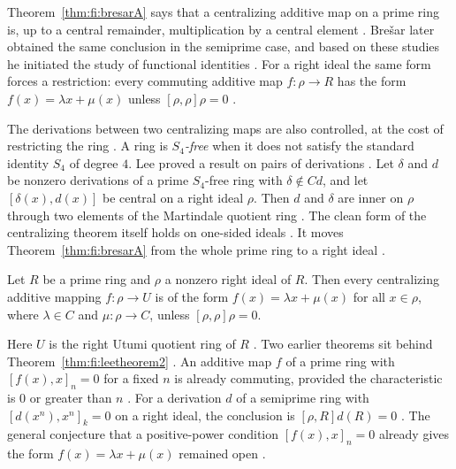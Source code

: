 Theorem~\ref{thm:fi:bresarA} says that a centralizing additive map on a
prime ring is, up to a central remainder, multiplication by a central
element \cite[p.~385]{Bresar1993}. Bre\v{s}ar later obtained the same
conclusion in the semiprime case, and based on these studies he initiated
the study of functional identities \cite[p.~333]{LeeTK1997Centralizing}.
For a right ideal the same form forces a restriction: every commuting
additive map $f\colon\rho\to R$ has the form $f(x)=\lambda x+\mu(x)$
unless $[\rho,\rho]\rho=0$ \cite[p.~333]{LeeTK1997Centralizing}.

The derivations between two centralizing maps are also controlled, at the
cost of restricting the ring \cite[p.~334]{LeeTK1997Centralizing}. A ring
is \emph{$S_4$-free} when it does not
satisfy the standard identity $S_4$ of degree $4$. Lee proved a result on
pairs of derivations \cite[Theorem~1, p.~334]{LeeTK1997Centralizing}.
Let $\delta$ and $d$ be nonzero derivations of a prime $S_4$-free ring with
$\delta\notin Cd$, and let $[\delta(x),d(x)]$ be central on a right ideal
$\rho$. Then $d$ and $\delta$ are inner on $\rho$ through two elements of
the Martindale quotient ring
\cite[Theorem~1, p.~334]{LeeTK1997Centralizing}.
The clean form of the centralizing theorem itself holds on one-sided
ideals \cite[Theorem~2, p.~335]{LeeTK1997Centralizing}. It moves
Theorem~\ref{thm:fi:bresarA} from the whole prime ring to a right ideal
\cite[p.~335]{LeeTK1997Centralizing}.

\begin{theorem}\label{thm:fi:leetheorem2}
Let $R$ be a prime ring and $\rho$ a nonzero right ideal of $R$. Then
every centralizing additive mapping $f\colon\rho\to U$ is of the form
$f(x)=\lambda x+\mu(x)$ for all $x\in\rho$, where $\lambda\in C$ and
$\mu\colon\rho\to C$, unless $[\rho,\rho]\rho=0$.
\end{theorem}

Here $U$ is the right Utumi quotient ring of $R$
\cite[p.~334]{LeeTK1997Centralizing}. Two earlier theorems sit behind
Theorem~\ref{thm:fi:leetheorem2} \cite[p.~334]{LeeTK1997Centralizing}.
An additive map $f$ of a prime ring with $[f(x),x]_n=0$ for a
fixed $n$ is already commuting, provided the characteristic is $0$ or
greater than $n$ \cite[Theorem~B, p.~334]{LeeTK1997Centralizing}. For a
derivation $d$ of a semiprime ring with $[d(x^n),x^n]_k=0$ on a right
ideal, the conclusion is $[\rho,R]d(R)=0$
\cite[Theorem~L, p.~334]{LeeTK1997Centralizing}. The general conjecture
that a positive-power condition $[f(x),x]_n=0$ already gives the form
$f(x)=\lambda x+\mu(x)$ remained open
\cite[p.~334]{LeeTK1997Centralizing}.


